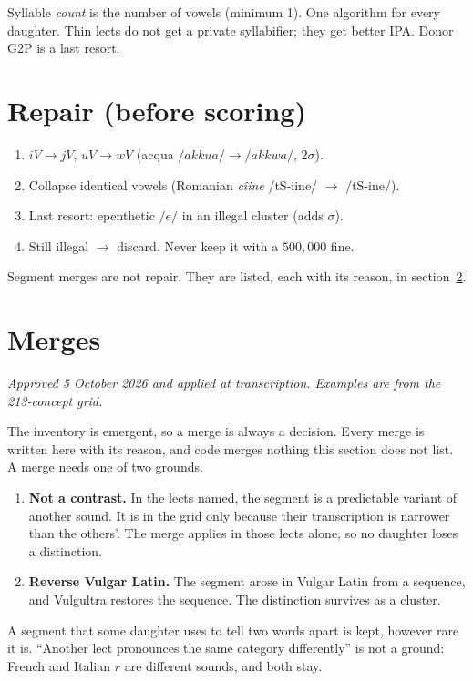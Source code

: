 \documentclass[12pt]{book}
\begin{document}
Syllable \emph{count} is the number of vowels (minimum 1). One
algorithm for every daughter. Thin lects do not get a private
syllabifier; they get better IPA. Donor G2P is a last resort.

\section{Repair (before scoring)}

\begin{enumerate}
  \item $iV \to jV$, $uV \to wV$ (acqua $/akkua/ \to /akkwa/$, $2\sigma$).
  \item Collapse identical vowels (Romanian \emph{cîine} /tS-iine/ $\to$ /tS-ine/).
  \item Last resort: epenthetic $/e/$ in an illegal cluster (adds $\sigma$).
  \item Still illegal $\to$ discard. Never keep it with a $500{,}000$ fine.
\end{enumerate}

Segment merges are not repair. They are listed, each with its reason, in
section~\ref{sec:merges}.

\section{Merges}
\label{sec:merges}

\emph{Approved 5 October 2026 and applied at transcription. Examples are
from the 213-concept grid.}

The inventory is emergent, so a merge is always a decision. Every merge is
written here with its reason, and code merges nothing this section does not
list. A merge needs one of two grounds.

\begin{enumerate}
  \item \textbf{Not a contrast.} In the lects named, the segment is a
        predictable variant of another sound. It is in the grid only
        because their transcription is narrower than the others'. The
        merge applies in those lects alone, so no daughter loses a
        distinction.
  \item \textbf{Reverse Vulgar Latin.} The segment arose in Vulgar Latin
        from a sequence, and Vulgultra restores the sequence. The
        distinction survives as a cluster.
\end{enumerate}

A segment that some daughter uses to tell two words apart is kept,
however rare it is. ``Another lect pronounces the same category
differently'' is not a ground: French  and Italian $r$ are
different sounds, and both stay.
\end{document}
